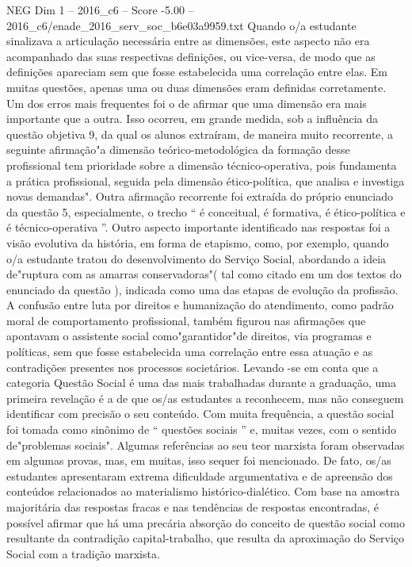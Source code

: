 \begin{textsample}{NEG Dim 1 – 2016\_c6 – Score -5.00 – 2016\_c6/enade\_2016\_serv\_soc\_b6e03a9959.txt}
Quando o/a estudante sinalizava a articulação necessária entre as dimensões, este aspecto não era acompanhado das suas respectivas definições, ou vice-versa, de modo que as definições apareciam sem que fosse estabelecida uma correlação entre elas.
Em muitas questões, apenas uma ou duas dimensões eram definidas corretamente.
Um dos erros mais frequentes foi o de afirmar que uma dimensão era mais importante que a outra.
Isso ocorreu, em grande medida, sob a influência da questão objetiva 9, da qual os alunos extraíram, de maneira muito recorrente, a seguinte afirmação"a dimensão teórico-metodológica da formação desse profissional tem prioridade sobre a dimensão técnico-operativa, pois fundamenta a prática profissional, seguida pela dimensão ético-política, que analisa e investiga novas demandas".
Outra afirmação recorrente foi extraída do próprio enunciado da questão 5, especialmente, o trecho “ é conceitual, é formativa, é ético-política e é técnico-operativa ”.
Outro aspecto importante identificado nas respostas foi a visão evolutiva da história, em forma de etapismo, como, por exemplo, quando o/a estudante tratou do desenvolvimento do Serviço Social, abordando a ideia de"ruptura com as amarras conservadoras"( tal como citado em um dos textos do enunciado da questão ), indicada como uma das etapas de evolução da profissão.
A confusão entre luta por direitos e humanização do atendimento, como padrão moral de comportamento profissional, também figurou nas afirmações que apontavam o assistente social como"garantidor"de direitos, via programas e políticas, sem que fosse estabelecida uma correlação entre essa atuação e as contradições presentes nos processos societários.
Levando -se em conta que a categoria Questão Social é uma das mais trabalhadas durante a graduação, uma primeira revelação é a de que os/as estudantes a reconhecem, mas não conseguem identificar com precisão o seu conteúdo.
Com muita frequência, a questão social foi tomada como sinônimo de “ questões sociais ” e, muitas vezes, com o sentido de"problemas sociais".
Algumas referências ao seu teor marxista foram observadas em algumas provas, mas, em muitas, isso sequer foi mencionado.
De fato, os/as estudantes apresentaram extrema dificuldade argumentativa e de apreensão dos conteúdos relacionados ao materialismo histórico-dialético.
Com base na amostra majoritária das respostas fracas e nas tendências de respostas encontradas, é possível afirmar que há uma precária absorção do conceito de questão social como resultante da contradição capital-trabalho, que resulta da aproximação do Serviço Social com a tradição marxista.

\end{textsample}
